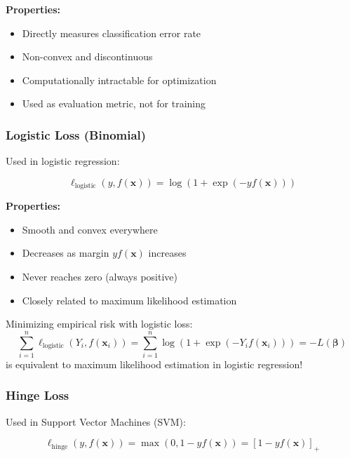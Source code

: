 \documentclass[12pt,a4paper]{article}
\begin{document}
\textbf{Properties:}
\begin{itemize}
    \item Directly measures classification error rate
    \item Non-convex and discontinuous
    \item Computationally intractable for optimization
    \item Used as evaluation metric, not for training
\end{itemize}

\subsubsection{Logistic Loss (Binomial)}

Used in logistic regression:

\begin{equation}
\ell_{\text{logistic}}(y, f(\mathbf{x})) = \log(1 + \exp(-yf(\mathbf{x})))
\end{equation}

\textbf{Properties:}
\begin{itemize}
    \item Smooth and convex everywhere
    \item Decreases as margin $yf(\mathbf{x})$ increases
    \item Never reaches zero (always positive)
    \item Closely related to maximum likelihood estimation
\end{itemize}

\begin{tcolorbox}[colback=green!5!white,colframe=green!75!black,title=Connection to ML Estimation]
Minimizing empirical risk with logistic loss:
$$\sum_{i=1}^n \ell_{\text{logistic}}(Y_i, f(\mathbf{x}_i)) = \sum_{i=1}^n \log(1 + \exp(-Y_i f(\mathbf{x}_i))) = -L(\boldsymbol{\beta})$$
is equivalent to maximum likelihood estimation in logistic regression!
\end{tcolorbox}

\subsubsection{Hinge Loss}

Used in Support Vector Machines (SVM):

\begin{equation}
\ell_{\text{hinge}}(y, f(\mathbf{x})) = \max(0, 1 - yf(\mathbf{x})) = [1 - yf(\mathbf{x})]_+
\end{equation}
\end{document}
